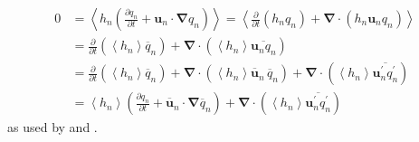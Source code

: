 \documentclass[12pt,a4paper]{report}
\newcommand*\thkmean[1]{\overline{#1}}
\newcommand*\thkres[1]{{#1}^{\prime}}
\newcommand*\nthkmean[1]{\left\langle{#1}\right\rangle}
\newcommand*{\partialdiff}[2][{}]{\frac{\partial #1}{\partial #2}}
\begin{document}
    \begin{equation}
    \begin{split}
    0&=\nthkmean{ h_{n} \left(\partialdiff[q_{n}]{t} + \boldsymbol{u}_{n} \cdot\boldsymbol{\nabla}q_{n} \right) } =
    \nthkmean{  \partialdiff{t}\left(h_{n}q_{n}\right) +  \boldsymbol{\nabla}\cdot\left(h_{n}\boldsymbol{u}_{n}q_{n} \right)}  \\
    &= \partialdiff{t} \left(\nthkmean{ h_{n} } \thkmean{q}_{n}\right)
    +  \boldsymbol{\nabla}\cdot\left( \nthkmean{ h_{n}}\thkmean{\boldsymbol{u}_{n}q_{n}} \right) \\
    &= \partialdiff{t} \left(\nthkmean{h_{n}} \thkmean{q}_{n}\right) +  \boldsymbol{\nabla}\cdot\left( \nthkmean{h_{n}} \thkmean{\boldsymbol{u}}_{n} \, \thkmean{q}_{n} \right) +  \boldsymbol{\nabla}\cdot\left( \nthkmean{h_{n}} \thkmean{\thkres{\boldsymbol{u}}_{n}\thkres{q}_{n}} \right) \\
    &= \nthkmean{h_{n}} \left(\partialdiff[q_{n}]{t}+  \thkmean{\boldsymbol{u}}_{n}\cdot \boldsymbol{\nabla}\thkmean{q}_{n} \right) +  \boldsymbol{\nabla}\cdot\left( \nthkmean{h_{n}} \thkmean{\thkres{\boldsymbol{u}}_{n}\thkres{q}_{n}} \right)
    \end{split}
    \end{equation}
    as used by \cite{greatbatch1998exploring} and \cite{smith1999primitive}.
    
\end{document}
